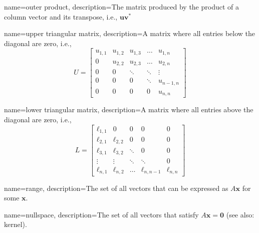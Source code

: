 \makeglossaries

{
        name=outer product,
        description={The matrix produced by the product of a column vector and its transpose, i.e., \(\mathbf{u}\mathbf{v}^*\)}
}

{
        name=upper triangular matrix,
        description={A matrix where all entries below the diagonal are zero, i.e., \[U = \begin{bmatrix}
                                        u_{1,1} & u_{1,2} & u_{1,3} & \ldots & u_{1,n}   \\
                                        0       & u_{2,2} & u_{2,3} & \ldots & u_{2,n}   \\
                                        0       & 0       & \ddots  & \ddots & \vdots    \\
                                        0       & 0       & 0       & \ddots & u_{n-1,n} \\
                                        0       & 0       & 0       & 0      & u_{n,n}
                                \end{bmatrix}\]}
}

{
        name=lower triangular matrix,
        description={A matrix where all entries above the diagonal are zero, i.e., \[L = \begin{bmatrix}
                                        \ell_{1,1} & 0          & 0      & 0            & 0          \\
                                        \ell_{2,1} & \ell_{2,2} & 0      & 0            & 0          \\
                                        \ell_{3,1} & \ell_{3,2} & \ddots & 0            & 0          \\
                                        \vdots     & \vdots     & \ddots & \ddots       & 0          \\
                                        \ell_{n,1} & \ell_{n,2} & \ldots & \ell_{n,n-1} & \ell_{n,n}
                                \end{bmatrix}\]}
}

{
        name=range,
        description={The set of all vectors that can be expressed as \(A\mathbf{x}\) for some \(\mathbf{x}\).}
}

{
        name=nullspace,
        description={The set of all vectors that satisfy \(A\mathbf{x}=\mathbf{0}\) (see also: kernel).}
}

